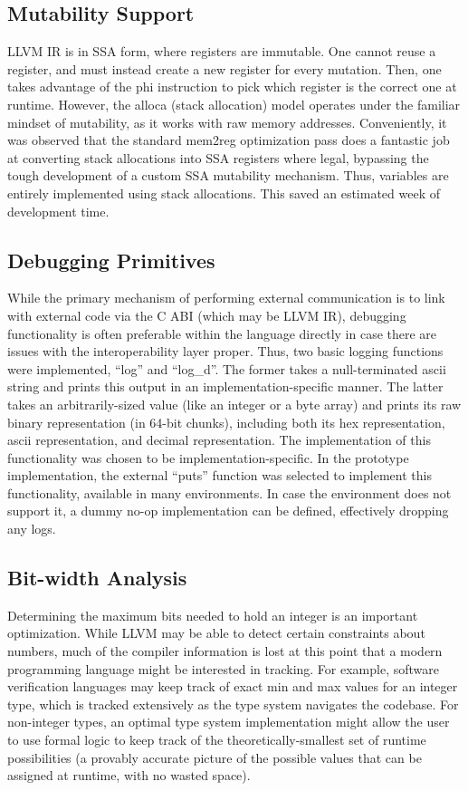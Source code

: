 \documentclass[12pt,a4paper,twoside]{report}
\begin{document}
\subsection{Mutability Support}

LLVM IR is in SSA form, where registers are immutable. One cannot reuse a register, and must instead create a new register for every mutation. Then, one takes advantage of the phi instruction to pick which register is the correct one at runtime. However, the alloca (stack allocation) model operates under the familiar mindset of mutability, as it works with raw memory addresses. Conveniently, it was observed that the standard mem2reg optimization pass does a fantastic job at converting stack allocations into SSA registers where legal, bypassing the tough development of a custom SSA mutability mechanism. Thus, variables are entirely implemented using stack allocations. This saved an estimated week of development time.

\subsection{Debugging Primitives}

While the primary mechanism of performing external communication is to link with external code via the C ABI (which may be LLVM IR), debugging functionality is often preferable within the language directly in case there are issues with the interoperability layer proper. Thus, two basic logging functions were implemented, ``log'' and ``log\_d''. The former takes a null-terminated ascii string and prints this output in an implementation-specific manner. The latter takes an arbitrarily-sized value (like an integer or a byte array) and prints its raw binary representation (in 64-bit chunks), including both its hex representation, ascii representation, and decimal representation. The implementation of this functionality was chosen to be implementation-specific. In the prototype implementation, the external ``puts'' function was selected to implement this functionality, available in many environments. In case the environment does not support it, a dummy no-op implementation can be defined, effectively dropping any logs.

\subsection{Bit-width Analysis}

Determining the maximum bits needed to hold an integer is an important optimization. While LLVM may be able to detect certain constraints about numbers, much of the compiler information is lost at this point that a modern programming language might be interested in tracking. For example, software verification languages may keep track of exact min and max values for an integer type, which is tracked extensively as the type system navigates the codebase. For non-integer types, an optimal type system implementation might allow the user to use formal logic to keep track of the theoretically-smallest set of runtime possibilities (a provably accurate picture of the possible values that can be assigned at runtime, with no wasted space).
\end{document}
